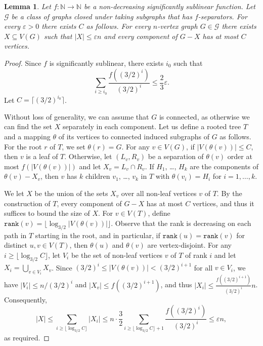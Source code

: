 \documentclass[12pt]{article}
\newtheorem{lemma}[theorem]{Lemma}
\newcommand{\mc}[1]{\mathcal{#1}}
\begin{document}
\begin{lemma}\label{lemma-bdedcomp}
	Let $f:\mathbb{N}\to\mathbb{N}$ be a non-decreasing significantly sublinear function.
	Let $\mc{G}$ be a class of graphs closed under taking subgraphs that has $f$-separators.
	For every $\varepsilon>0$ there exists $C$ as follows. For every $n$-vertex graph $G \in \mc{G}$ there exists $X \subseteq V(G)$ such that
	$|X|\le \varepsilon n$ and every component of $G - X$ has at most $C$ vertices.  
\end{lemma}
\begin{proof}
	Since $f$ is significantly sublinear, there exists $i_0$ such that
	$$\sum_{i\ge i_0} \frac{f((3/2)^i)}{(3/2)^i}\le \frac{2}{3}\varepsilon.$$
	Let $C=\lceil (3/2)^{i_0}\rceil$.
	
	Without loss of generality, we can assume that $G$ is connected, as otherwise we can find the set $X$ separately in each component.
	Let us define a rooted tree $T$ and a mapping $\theta$ of its vertices to connected induced subgraphs of $G$ as follows.
	For the root $r$ of $T$, we set $\theta(r)=G$.  For any $v\in V(G)$, if $|V(\theta(v))|\le C$, then $v$ is a leaf of $T$.
	Otherwise, let $(L_v,R_v)$ be a separation of $\theta(v)$ order at most $f(|V(\theta(v))|)$ and let $X_v=L_v\cap R_v$.
	If $H_1$, \ldots, $H_k$ are the components of $\theta(v)-X_v$, then $v$ has $k$ children $v_1$, \ldots, $v_k$ in $T$ with
	$\theta(v_i)=H_i$ for $i=1,\ldots, k$.
	
	We let $X$ be the union of the sets $X_v$ over all non-leaf vertices $v$ of $T$.  By the construction of $T$, every component
	of $G-X$ has at most $C$ vertices, and thus it suffices to bound the size of $X$.  For $v\in V(T)$, define
	$\mathtt{rank}(v)=\lfloor \log_{3/2} |V(\theta(v))|\rfloor$.  Observe that the rank is decreasing on each path in $T$
	starting in the root, and in particular, if $\mathtt{rank}(u)=\mathtt{rank}(v)$ for distinct $u,v\in V(T)$, then
	$\theta(u)$ and $\theta(v)$ are vertex-disjoint.  For any $i\ge \lfloor \log_{3/2} C\rfloor$, let $V_i$
	be the set of non-leaf vertices $v$ of $T$ of rank $i$ and let $X_i=\bigcup_{v\in V_i} X_v$.
	Since $(3/2)^i\le |V(\theta(v))|<(3/2)^{i+1}$ for all $v\in V_i$, we have $|V_i|\le n/(3/2)^i$ and $|X_v|\le f((3/2)^{i+1})$,
	and thus $|X_i|\le \frac{f((3/2)^{i+1})}{(3/2)^i}n$.  Consequently,
	$$|X|\le \sum_{i\ge \lfloor \log_{3/2} C\rfloor} |X_i|\le n\cdot\frac{3}{2}\sum_{i\ge \lfloor \log_{3/2} C\rfloor+1}\frac{f((3/2)^i)}{(3/2)^i}\le \varepsilon n,$$
	as required.
\end{proof}	
\end{document}
